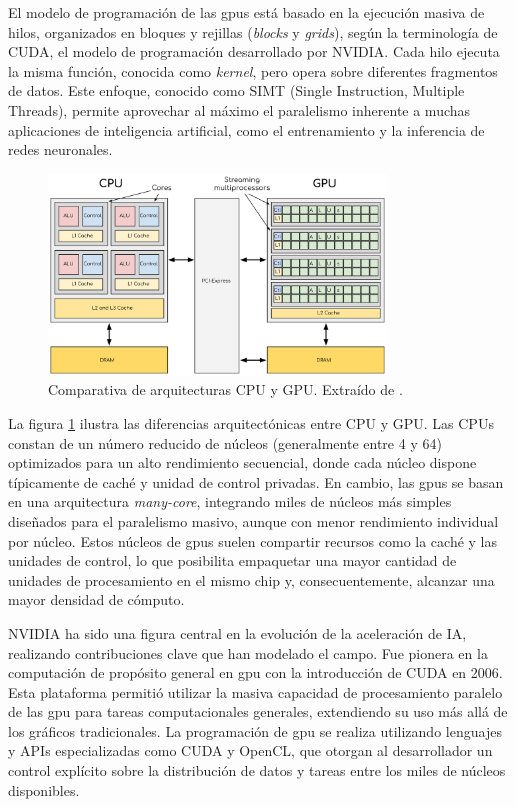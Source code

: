 \documentclass[11pt,spanish,listoffigures,listoftables]{tfgetsinf}
\begin{document}
El modelo de programación de las \glspl{gpu} está basado en la ejecución masiva de hilos, organizados en bloques y rejillas (\textit{blocks} y \textit{grids}), según la terminología de CUDA, el modelo de programación desarrollado por NVIDIA. Cada hilo ejecuta la misma función, conocida como \textit{kernel}, pero opera sobre diferentes fragmentos de datos. Este enfoque, conocido como SIMT (Single Instruction, Multiple Threads), permite aprovechar al máximo el paralelismo inherente a muchas aplicaciones de inteligencia artificial, como el entrenamiento y la inferencia de redes neuronales.

\begin{figure}[H]
   \centering
   \includegraphics[width=0.8\textwidth]{images/estado_del_arte/cpu_vs_gpu.png}
   \caption[Comparativa de arquitecturas CPU y GPU]{Comparativa de arquitecturas CPU y GPU. Extraído de \cite{enccs_gpu_ecosystem}.}
   \label{fig:cpu_vs_gpu}
\end{figure}
La figura \ref{fig:cpu_vs_gpu} ilustra las diferencias arquitectónicas entre CPU y GPU. Las CPUs constan de un número reducido de núcleos (generalmente entre 4 y 64) optimizados para un alto rendimiento secuencial, donde cada núcleo dispone típicamente de caché y unidad de control privadas. En cambio, las \glspl{gpu} se basan en una arquitectura \textit{many-core}, integrando miles de núcleos más simples diseñados para el paralelismo masivo, aunque con menor rendimiento individual por núcleo. Estos núcleos de \glspl{gpu} suelen compartir recursos como la caché y las unidades de control, lo que posibilita empaquetar una mayor cantidad de unidades de procesamiento en el mismo chip y, consecuentemente, alcanzar una mayor densidad de cómputo.


NVIDIA ha sido una figura central en la evolución de la aceleración de IA, realizando contribuciones clave que han modelado el campo. Fue pionera en la computación de propósito general en \gls{gpu} con la introducción de CUDA en 2006. Esta plataforma permitió utilizar la masiva capacidad de procesamiento paralelo de las \gls{gpu} para tareas computacionales generales, extendiendo su uso más allá de los gráficos tradicionales. La programación de \gls{gpu} se realiza utilizando lenguajes y APIs especializadas como CUDA y OpenCL, que otorgan al desarrollador un control explícito sobre la distribución de datos y tareas entre los miles de núcleos disponibles.
\end{document}

